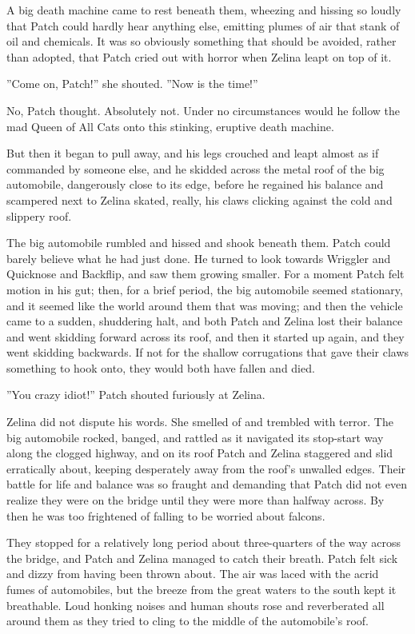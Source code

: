 \documentclass[12pt]{book}
\begin{document}
A big death machine came to rest beneath them, wheezing and hissing so loudly that Patch could hardly hear anything else, emitting plumes of air that stank of oil and chemicals. It was so obviously something that should be avoided, rather than adopted, that Patch cried out with horror when Zelina leapt on top of it.\par
''Come on, Patch!'' she shouted. ''Now is the time!''\par
No, Patch thought. Absolutely not. Under no circumstances would he follow the mad Queen of All Cats onto this stinking, eruptive death machine.\par
But then it began to pull away, and his legs crouched and leapt almost as if commanded by someone else, and he skidded across the metal roof of the big automobile, dangerously close to its edge, before he regained his balance and scampered next to Zelina %
 skated, really, his claws clicking against the cold and slippery roof.\par
The big automobile rumbled and hissed and shook beneath them. Patch could barely believe what he had just done. He turned to look towards Wriggler and Quicknose and Backflip, and saw them growing smaller. For a moment Patch felt motion in his gut; then, for a brief period, the big automobile seemed stationary, and it seemed like the world around them that was moving; and then the vehicle came to a sudden, shuddering halt, and both Patch and Zelina lost their balance and went skidding forward across its roof, and then it started up again, and they went skidding backwards. If not for the shallow corrugations that gave their claws something to hook onto, they would both have fallen and died.\par
''You crazy idiot!'' Patch shouted furiously at Zelina.\par
Zelina did not dispute his words. She smelled of and trembled with terror. The big automobile rocked, banged, and rattled as it navigated its stop-start way along the clogged highway, and on its roof Patch and Zelina staggered and slid erratically about, keeping desperately away from the roof's unwalled edges. Their battle for life and balance was so fraught and demanding that Patch did not even realize they were on the bridge until they were more than halfway across. By then he was too frightened of falling to be worried about falcons.\par
They stopped for a relatively long period about three-quarters of the way across the bridge, and Patch and Zelina managed to catch their breath. Patch felt sick and dizzy from having been thrown about. The air was laced with the acrid fumes of automobiles, but the breeze from the great waters to the south kept it breathable. Loud honking noises and human shouts rose and reverberated all around them as they tried to cling to the middle of the automobile's roof.\par
\end{document}
